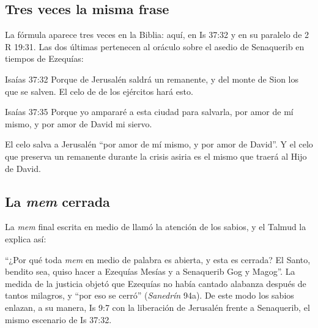 
\subsection{Tres veces la misma frase}
La fórmula  aparece tres veces en la Biblia: aquí, en Is 37:32 y en su paralelo de 2 R 19:31. Las dos últimas pertenecen al oráculo sobre el asedio de Senaquerib en tiempos de Ezequías:

\begin{verso}{Isaías 37:32}
Porque de Jerusalén saldrá un remanente, y del monte de Sion los que se salven. El celo de \SENOR{} de los ejércitos hará esto.
\end{verso}
\begin{verso}{Isaías 37:35}
Porque yo ampararé a esta ciudad para salvarla, por amor de mí mismo, y por amor de David mi siervo.
\end{verso}

El celo salva a Jerusalén ``por amor de mí mismo, y por amor de David''. Y el celo que preserva un remanente durante la crisis asiria es el mismo que traerá al Hijo de David.


\subsection{La \emph{mem} cerrada}
La \emph{mem} final escrita en medio de  llamó la atención de los sabios, y el Talmud la explica así:


``¿Por qué toda \emph{mem} en medio de palabra es abierta, y esta es cerrada? El Santo, bendito sea, quiso hacer a Ezequías Mesías y a Senaquerib Gog y Magog''. La medida de la justicia objetó que Ezequías no había cantado alabanza después de tantos milagros, y ``por eso se cerró'' (\emph{Sanedrín} 94a). De este modo los sabios enlazan, a su manera, Is 9:7 con la liberación de Jerusalén frente a Senaquerib, el mismo escenario de Is 37:32.

